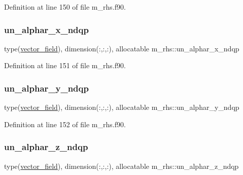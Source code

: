 Definition at line 150 of file m\+\_\+rhs.\+f90.

\mbox{\label{namespacem__rhs_aca82442008ec6a9c478cdfa1b67b7e40}} 
\subsubsection{\texorpdfstring{un\+\_\+alphar\+\_\+x\+\_\+ndqp}{un\_alphar\_x\_ndqp}}
{\footnotesize\ttfamily type(\hyperlink{structm__derived__types_1_1vector__field}{vector\+\_\+field}), dimension(\+:,\+:,\+:), allocatable m\+\_\+rhs\+::un\+\_\+alphar\+\_\+x\+\_\+ndqp}



Definition at line 151 of file m\+\_\+rhs.\+f90.

\mbox{\label{namespacem__rhs_a2b31029abb8eed5463485244c8029420}} 
\subsubsection{\texorpdfstring{un\+\_\+alphar\+\_\+y\+\_\+ndqp}{un\_alphar\_y\_ndqp}}
{\footnotesize\ttfamily type(\hyperlink{structm__derived__types_1_1vector__field}{vector\+\_\+field}), dimension(\+:,\+:,\+:), allocatable m\+\_\+rhs\+::un\+\_\+alphar\+\_\+y\+\_\+ndqp}



Definition at line 152 of file m\+\_\+rhs.\+f90.

\mbox{\label{namespacem__rhs_a9a204df83f1d0c0ce63177fbc33e1f76}} 
\subsubsection{\texorpdfstring{un\+\_\+alphar\+\_\+z\+\_\+ndqp}{un\_alphar\_z\_ndqp}}
{\footnotesize\ttfamily type(\hyperlink{structm__derived__types_1_1vector__field}{vector\+\_\+field}), dimension(\+:,\+:,\+:), allocatable m\+\_\+rhs\+::un\+\_\+alphar\+\_\+z\+\_\+ndqp}



